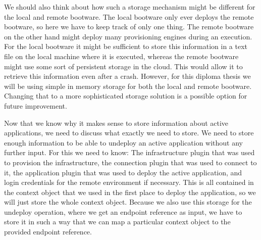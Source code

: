 We should also think about how such a storage mechanism might be different for the local and remote bootware.
The local bootware only ever deploys the remote bootware, so here we have to keep track of only one thing.
The remote bootware on the other hand might deploy many provisioning engines during an execution.
For the local bootware it might be sufficient to store this information in a text file on the local machine where it is executed, whereas the remote bootware might use some sort of persistent storage in the cloud.
This would allow it to retrieve this information even after a crash.
However, for this diploma thesis we will be using simple in memory storage for both the local and remote bootware.
Changing that to a more sophisticated storage solution is a possible option for future improvement.

Now that we know why it makes sense to store information about active applications, we need to discuss what exactly we need to store.
We need to store enough information to be able to undeploy an active application without any further input.
For this we need to know: The infrastructure plugin that was used to provision the infrastructure, the connection plugin that was used to connect to it, the application plugin that was used to deploy the active application, and login credentials for the remote environment if necessary.
This is all contained in the context object that we used in the first place to deploy the application, so we will just store the whole context object.
Because we also use this storage for the undeploy operation, where we get an endpoint reference as input, we have to store it in such a way that we can map a particular context object to the provided endpoint reference.

